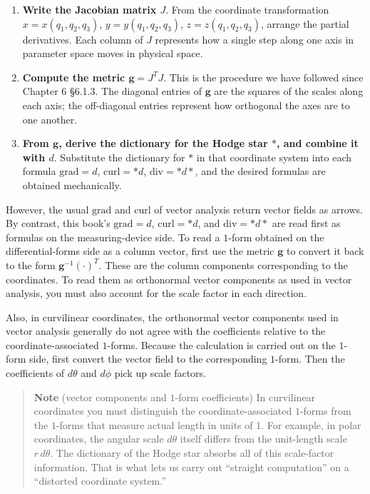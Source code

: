 \documentclass[a4paper,12pt,openany]{book}
\begin{document}
\begin{enumerate}
\def\labelenumi{\arabic{enumi}.}
\item
  \textbf{Write the Jacobian matrix $J$}. From the coordinate
  transformation \(x = x(q_1,q_2,q_3)\), \(y = y(q_1,q_2,q_3)\),
  \(z = z(q_1,q_2,q_3)\), arrange the partial derivatives. Each column
  of \(J\) represents how a single step along one axis in parameter
  space moves in physical space.
\item
  \textbf{Compute the metric $\mathbf{g} = J^T J$}. This is the
  procedure we have followed since Chapter 6 §6.1.3. The diagonal
  entries of \(\mathbf{g}\) are the squares of the scales along each
  axis; the off-diagonal entries represent how orthogonal the axes are
  to one another.
\item
  \textbf{From $\mathbf{g}$, derive the dictionary for the Hodge star $\ast$, and combine it with $d$}.
  Substitute the dictionary for \(\ast\) in that coordinate system into
  each formula \(\mathrm{grad} = d\), \(\mathrm{curl}=\ast d\),
  \(\mathrm{div}=\ast d\ast\), and the desired formulas are obtained
  mechanically.
\end{enumerate}

However, the usual \(\mathrm{grad}\) and \(\mathrm{curl}\) of vector
analysis return vector fields as arrows. By contrast, this book's
\(\mathrm{grad}=d\), \(\mathrm{curl}=\ast d\), and
\(\mathrm{div}=\ast d\ast\) are read first as formulas on the
measuring-device side. To read a \(1\)-form obtained on the
differential-forms side as a column vector, first use the metric
\(\mathbf{g}\) to convert it back to the form
\(\mathbf{g}^{-1}(\cdot)^T\). These are the column components
corresponding to the coordinates. To read them as orthonormal vector
components as used in vector analysis, you must also account for the
scale factor in each direction.

Also, in curvilinear coordinates, the orthonormal vector components used
in vector analysis generally do not agree with the coefficients relative
to the coordinate-associated \(1\)-forms. Because the calculation is
carried out on the \(1\)-form side, first convert the vector field to
the corresponding \(1\)-form. Then the coefficients of \(d\theta\) and
\(d\phi\) pick up scale factors.

\begin{quote}
\textbf{Note} (vector components and \(1\)-form coefficients) In
curvilinear coordinates you must distinguish the coordinate-associated
\(1\)-forms from the \(1\)-forms that measure actual length in units of
1. For example, in polar coordinates, the angular scale \(d\theta\)
itself differs from the unit-length scale \(r\,d\theta\). The dictionary
of the Hodge star absorbs all of this scale-factor information. That is
what lets us carry out ``straight computation'' on a ``distorted
coordinate system.''
\end{quote}
\end{document}
